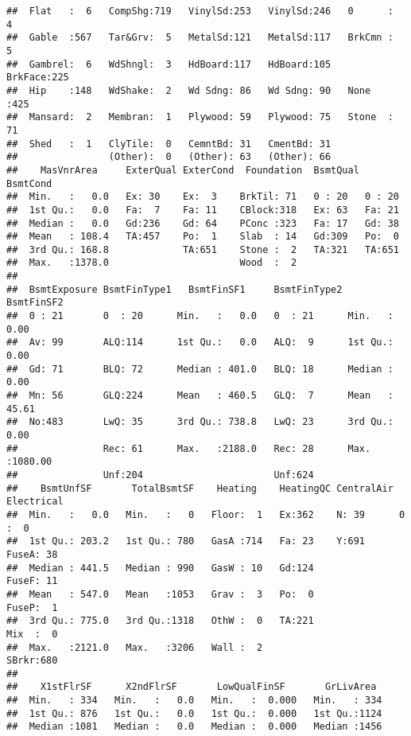 \documentclass[]{article}
\begin{document}
\begin{verbatim}
##  Flat   :  6   CompShg:719   VinylSd:253   VinylSd:246   0      :  4  
##  Gable  :567   Tar&Grv:  5   MetalSd:121   MetalSd:117   BrkCmn :  5  
##  Gambrel:  6   WdShngl:  3   HdBoard:117   HdBoard:105   BrkFace:225  
##  Hip    :148   WdShake:  2   Wd Sdng: 86   Wd Sdng: 90   None   :425  
##  Mansard:  2   Membran:  1   Plywood: 59   Plywood: 75   Stone  : 71  
##  Shed   :  1   ClyTile:  0   CemntBd: 31   CmentBd: 31                
##                (Other):  0   (Other): 63   (Other): 66                
##    MasVnrArea     ExterQual ExterCond  Foundation  BsmtQual BsmtCond
##  Min.   :   0.0   Ex: 30    Ex:  3    BrkTil: 71   0 : 20   0 : 20  
##  1st Qu.:   0.0   Fa:  7    Fa: 11    CBlock:318   Ex: 63   Fa: 21  
##  Median :   0.0   Gd:236    Gd: 64    PConc :323   Fa: 17   Gd: 38  
##  Mean   : 108.4   TA:457    Po:  1    Slab  : 14   Gd:309   Po:  0  
##  3rd Qu.: 168.8             TA:651    Stone :  2   TA:321   TA:651  
##  Max.   :1378.0                       Wood  :  2                    
##                                                                     
##  BsmtExposure BsmtFinType1   BsmtFinSF1     BsmtFinType2   BsmtFinSF2     
##  0 : 21       0  : 20      Min.   :   0.0   0  : 21      Min.   :   0.00  
##  Av: 99       ALQ:114      1st Qu.:   0.0   ALQ:  9      1st Qu.:   0.00  
##  Gd: 71       BLQ: 72      Median : 401.0   BLQ: 18      Median :   0.00  
##  Mn: 56       GLQ:224      Mean   : 460.5   GLQ:  7      Mean   :  45.61  
##  No:483       LwQ: 35      3rd Qu.: 738.8   LwQ: 23      3rd Qu.:   0.00  
##               Rec: 61      Max.   :2188.0   Rec: 28      Max.   :1080.00  
##               Unf:204                       Unf:624                       
##    BsmtUnfSF       TotalBsmtSF    Heating    HeatingQC CentralAir Electrical 
##  Min.   :   0.0   Min.   :   0   Floor:  1   Ex:362    N: 39      0    :  0  
##  1st Qu.: 203.2   1st Qu.: 780   GasA :714   Fa: 23    Y:691      FuseA: 38  
##  Median : 441.5   Median : 990   GasW : 10   Gd:124               FuseF: 11  
##  Mean   : 547.0   Mean   :1053   Grav :  3   Po:  0               FuseP:  1  
##  3rd Qu.: 775.0   3rd Qu.:1318   OthW :  0   TA:221               Mix  :  0  
##  Max.   :2121.0   Max.   :3206   Wall :  2                        SBrkr:680  
##                                                                              
##    X1stFlrSF      X2ndFlrSF       LowQualFinSF       GrLivArea   
##  Min.   : 334   Min.   :   0.0   Min.   :  0.000   Min.   : 334  
##  1st Qu.: 876   1st Qu.:   0.0   1st Qu.:  0.000   1st Qu.:1124  
##  Median :1081   Median :   0.0   Median :  0.000   Median :1456  

\end{verbatim}
\end{document}
